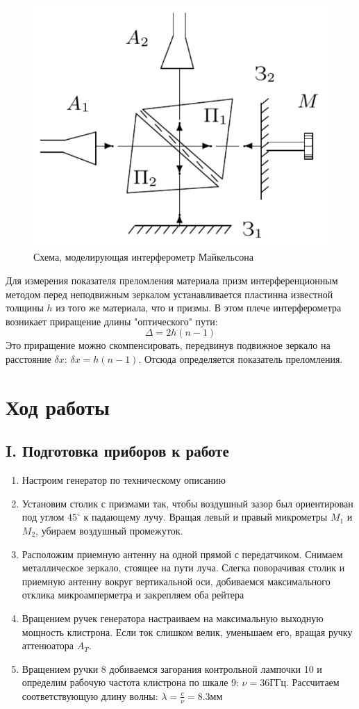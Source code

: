 \documentclass[a4paper,12pt]{article}
\begin{document}
\begin{figure}[h]
\centering
\includegraphics[width=0.4\linewidth]{img5.png}
\caption{Схема, моделирующая интерферометр Майкельсона}
\label{img5}
\end{figure}

Для измерения показателя преломления материала призм интерференционным методом перед неподвижным зеркалом устанавливается пластинна известной толщины $h$ из того же материала, что и призмы. В этом плече интерферометра возникает приращение длины "оптического" пути:
$$
\Delta = 2h(n-1)
$$
Это приращение можно скомпенсировать, передвинув подвижное зеркало на расстояние $\delta x$: $\delta x = h(n-1)$. Отсюда определяется показатель преломления.

\section{Ход работы}

\subsection{I. Подготовка приборов к работе}

\begin{enumerate}
    \item Настроим генератор по техническому описанию
    \item Установим столик с призмами так, чтобы воздушный зазор был ориентирован под углом $45^\circ$ к падающему лучу. Вращая левый и правый микрометры $M_1$ и $M_2$, убираем воздушный промежуток.
    \item Расположим приемную антенну на одной прямой с передатчиком. Снимаем металлическое зеркало, стоящее на пути луча. Слегка поворачивая столик и приемную антенну вокруг вертикальной оси, добиваемся максимального отклика микроамперметра и закрепляем оба рейтера
    \item Вращением ручек генератора настраиваем на максимальную выходную мощность клистрона. Если ток слишком велик, уменьшаем его, вращая ручку аттенюатора $A_T$.
    \item Вращением ручки 8 добиваемся загорания контрольной лампочки 10 и определим рабочую частота клистрона по шкале 9: $\nu=36\text{ГГц}$. Рассчитаем соответствующую длину волны: $\lambda=\frac{c}{\nu}=8.3\text{мм}$
\end{enumerate}
\end{document}
